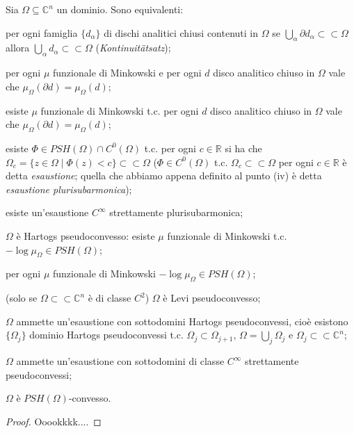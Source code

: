 \begin{thm}
  Sia $\Omega \subseteq \mathbb{C}^n$ un dominio. Sono equivalenti:
  \begin{nlist}
    \item per ogni famiglia $\{d_{\alpha}\}$ di dischi analitici chiusi contenuti in $\Omega$ se $\displaystyle \bigcup_{\alpha} \partial d_{\alpha} \subset\subset \Omega$ allora $\displaystyle \bigcup_{\alpha} d_{\alpha} \subset\subset \Omega$ (\textit{Kontinuitätsatz});
    \item per ogni $\mu$ funzionale di Minkowski e per ogni $d$ disco analitico chiuso in $\Omega$ vale che $\mu_{\Omega}(\partial d)=\mu_{\Omega}(d)$;
    \item esiste $\mu$ funzionale di Minkowski t.c. per ogni $d$ disco analitico chiuso in $\Omega$ vale che $\mu_{\Omega}(\partial d)=\mu_{\Omega}(d)$;
    \item esiste $\Phi \in PSH(\Omega) \cap C^0(\Omega)$ t.c. per ogni $c \in \mathbb{R}$ si ha che $\Omega_c=\{z \in \Omega \mid \Phi(z)<c\} \subset\subset \Omega$
    ($\Phi \in C^0(\Omega)$ t.c. $\Omega_c \subset\subset \Omega$ per ogni $c \in \mathbb{R}$ è detta \textit{esaustione}; quella che abbiamo appena definito al punto (iv) è detta \textit{esaustione plurisubarmonica});
    \item esiste un'esaustione $C^{\infty}$ strettamente plurisubarmonica;
    \item $\Omega$ è Hartogs pseudoconvesso: esiste $\mu$ funzionale di Minkowski t.c. $-\log{\mu_{\Omega}} \in PSH(\Omega)$;
    \item per ogni $\mu$ funzionale di Minkowski $-\log{\mu_{\Omega}} \in PSH(\Omega)$;
    \item (solo se $\Omega \subset\subset \mathbb{C}^n$ è di classe $C^2$) $\Omega$ è Levi pseudoconvesso;
    \item $\Omega$ ammette un'esaustione con sottodomini Hartogs pseudoconvessi, cioè esistono $\{\Omega_j\}$ dominio Hartogs pseudoconvessi t.c. $\Omega_j \subset \Omega_{j+1}$, $\displaystyle \Omega=\bigcup_j \Omega_j$ e $\Omega_j \subset\subset \mathbb{C}^n$;
    \item $\Omega$ ammette un'esaustione con sottodomini di classe $C^{\infty}$ strettamente pseudoconvessi;
    \item $\Omega$ è $PSH(\Omega)$-convesso.
  \end{nlist}
\end{thm}

\begin{proof}
  Ooookkkk....
\end{proof}
